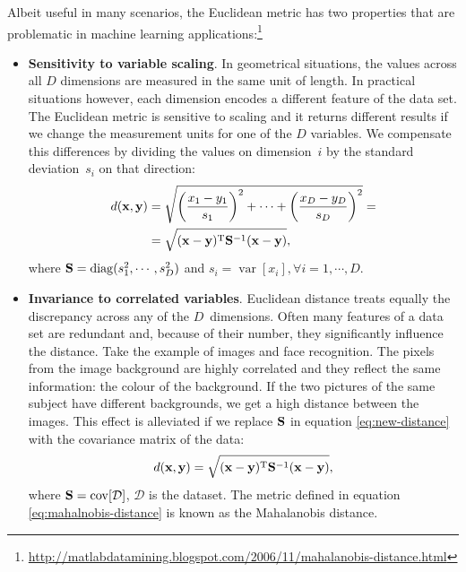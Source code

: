 Albeit useful in many scenarios, the Euclidean metric has two properties that are problematic in machine learning applications:\footnote{\protect\url{http://matlabdatamining.blogspot.com/2006/11/mahalanobis-distance.html}}
	\begin{itemize}
		 \item{ \textbf{Sensitivity to variable scaling}. In geometrical situations, the values across all $D$ dimensions are measured in the same unit of length. In practical situations however, each dimension encodes a different feature of the data set. The Euclidean metric is sensitive to scaling and it returns different results if we change the measurement units for one of the $D$ variables. We compensate this differences by dividing the values on dimension~$i$ by the standard deviation~$s_i$ on that direction:
		  \begin{align}
		   d(\mathbf{x},\mathbf{y}) &= \sqrt{\left(\frac{x_1-y_1}{s_1}\right)^2+\cdots+\left(\frac{x_D-y_D}{s_D}\right)^2} = \notag\\
		   &= \sqrt{(\mathbf{x-y})^\textrm{T}\mathbf{S}^{-1}(\mathbf{x-y})}, \label{eq:new-distance}
		  \end{align}
		 where $\mathbf{S}=\operatorname{diag}(s_1^2,\cdots,s_D^2)$ and $s_i = \operatorname{var}[x_i],\forall i=1,\cdots,D$.
		 }
		 \item{ \textbf{Invariance to correlated variables}. Euclidean distance treats equally the discrepancy across any of the $D$~dimensions. Often many features of a data set are redundant and, because of their number, they significantly influence the distance. Take the example of images and face recognition. The pixels from the image background are highly correlated and they reflect the same information: the colour of the background. If the two pictures of the same subject have different backgrounds, we get a high distance between the images. This effect is alleviated if we replace $\mathbf{S}$ in equation \eqref{eq:new-distance} with the covariance matrix of the data:
		 \begin{align}
		 d(\mathbf{x},\mathbf{y}) = \sqrt{(\mathbf{x-y})^\textrm{T}\mathbf{S}^{-1}(\mathbf{x-y})},
		 \label{eq:mahalnobis-distance}
		 \end{align}
		 where $\mathbf{S} = \operatorname{cov}[\mathcal{D}]$, $\mathcal{D}$ is the dataset. The metric defined in equation \ref{eq:mahalnobis-distance} is known as the Mahalanobis distance. %
		 }
	\end{itemize}
